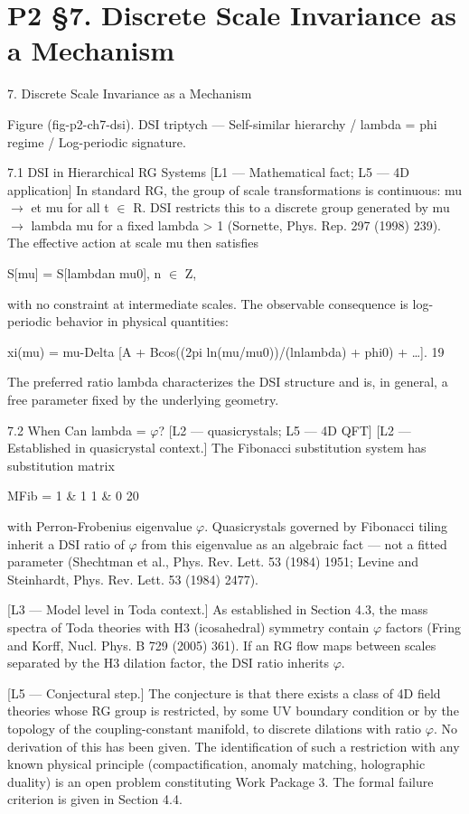
\section{P2 §7. Discrete Scale Invariance as a Mechanism}

7. Discrete Scale Invariance as a Mechanism

               Figure (fig-p2-ch7-dsi). DSI triptych --- Self-similar hierarchy / lambda = phi regime /
                                               Log-periodic signature.

  7.1 DSI in Hierarchical RG Systems [L1 --- Mathematical fact; L5 ---
  4D application]
  In standard RG, the group of scale transformations is continuous: mu $\rightarrow$ et mu for all t $\in$
  R. DSI restricts this to a discrete group generated by mu $\rightarrow$ lambda mu for a fixed
  lambda > 1 (Sornette, Phys. Rep. 297 (1998) 239). The effective action at scale mu then
  satisfies

  S[mu] = S[lambdan mu0], n $\in$ Z,

  with no constraint at intermediate scales. The observable consequence is log-periodic
  behavior in physical quantities:

  xi(mu) = mu-Delta [A + Bcos((2pi ln(mu/mu0))/(lnlambda) + phi0) + …]. 19

  The preferred ratio lambda characterizes the DSI structure and is, in general, a free
  parameter fixed by the underlying geometry.

  7.2 When Can lambda = $\varphi$? [L2 --- quasicrystals; L5 --- 4D QFT]
  [L2 --- Established in quasicrystal context.] The Fibonacci substitution system has
  substitution matrix

  MFib = 1 \& 1 1 \& 0 20

  with Perron-Frobenius eigenvalue $\varphi$. Quasicrystals governed by Fibonacci tiling inherit
  a DSI ratio of $\varphi$ from this eigenvalue as an algebraic fact --- not a fitted parameter
  (Shechtman et al., Phys. Rev. Lett. 53 (1984) 1951; Levine and Steinhardt, Phys. Rev.
  Lett. 53 (1984) 2477).

  [L3 --- Model level in Toda context.] As established in Section 4.3, the mass spectra of
  Toda theories with H3 (icosahedral) symmetry contain $\varphi$ factors (Fring and Korff, Nucl.
  Phys. B 729 (2005) 361). If an RG flow maps between scales separated by the H3
  dilation factor, the DSI ratio inherits $\varphi$.

  [L5 --- Conjectural step.] The conjecture is that there exists a class of 4D field theories
  whose RG group is restricted, by some UV boundary condition or by the topology of the
  coupling-constant manifold, to discrete dilations with ratio $\varphi$. No derivation of this has
  been given. The identification of such a restriction with any known physical principle
  (compactification, anomaly matching, holographic duality) is an open problem
  constituting Work Package 3. The formal failure criterion is given in Section 4.4.

